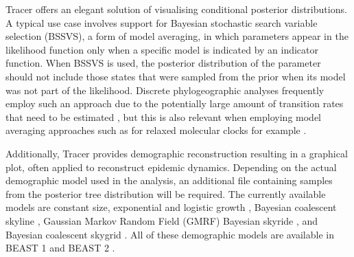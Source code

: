 \documentclass{bioinfo}
\begin{document}
Tracer offers an elegant solution of visualising conditional posterior distributions.
A typical use case involves support for Bayesian stochastic search variable selection (BSSVS), a form of model averaging, in which parameters appear in the likelihood function only when a specific model is indicated by an indicator function.
When BSSVS is used, the posterior distribution of the parameter should not include those states that were sampled from the prior when its model was not part of the likelihood.
Discrete phylogeographic analyses frequently employ such an approach due to the potentially large amount of transition rates that need to be estimated \citep{Lemey2009}, but this is also relevant when employing model averaging approaches such as for relaxed molecular clocks for example \citep{Li2012}.

Additionally, Tracer provides demographic reconstruction resulting in a graphical plot, often applied to reconstruct epidemic dynamics.
Depending on the actual demographic model used in the analysis, an additional file containing samples from the posterior tree distribution will be required.
The currently available models are constant size, exponential and logistic growth \citep{drummond2002estimating}, Bayesian coalescent skyline \citep{drummond2005bayesian}, Gaussian Markov Random Field (GMRF) Bayesian skyride \citep{minin2008smooth}, and Bayesian coalescent skygrid \citep{gill2012improving}.
All of these demographic models are available in BEAST 1 \citep{drummond2012bayesian} and BEAST 2 \citep{bouckaert2014beast2}.
\end{document}
